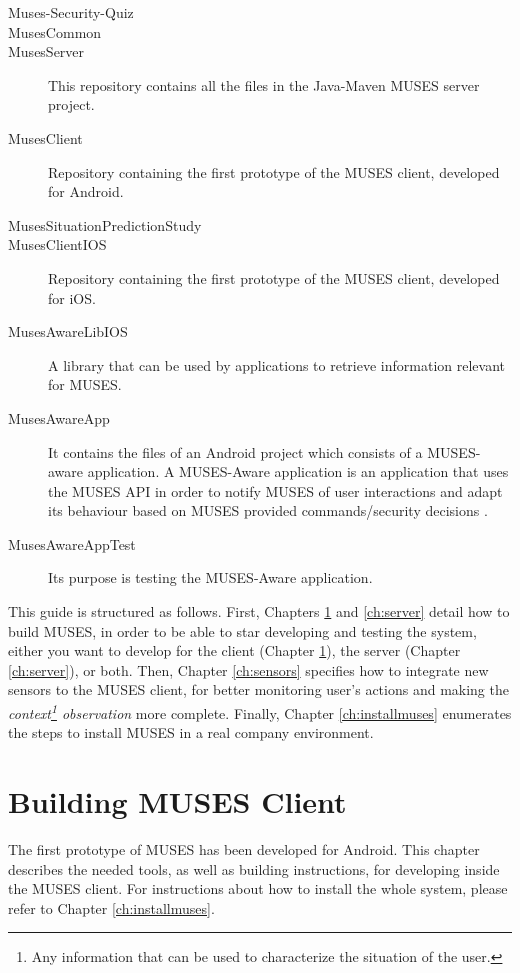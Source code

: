 \documentclass[a4paper,11pt]{book}
\begin{document}
\begin{description}
  \item[Muses-Security-Quiz]
  \item[MusesCommon] 
  \item[MusesServer] This repository contains all the files in the Java-Maven MUSES server project.
  \item[MusesClient] Repository containing the first prototype of the MUSES client, developed for Android.
  \item[MusesSituationPredictionStudy]
  \item[MusesClientIOS] Repository containing the first prototype of the MUSES client, developed for iOS.
  \item[MusesAwareLibIOS] A library that can be used by applications to retrieve information relevant for MUSES.
  \item[MusesAwareApp] It contains the files of an Android project which consists of a MUSES-aware application. A MUSES-Aware application is an application that uses the MUSES API in order to notify MUSES of user interactions and adapt its behaviour based on MUSES provided commands/security decisions \cite{deliverable24}.
  \item[MusesAwareAppTest] Its purpose is testing the MUSES-Aware application.
\end{description}

This guide is structured as follows. First, Chapters \ref{ch:client} and \ref{ch:server} detail how to build MUSES, in order to be able to star developing and testing the system, either you want to develop for the client (Chapter \ref{ch:client}), the server (Chapter \ref{ch:server}), or both. Then, Chapter \ref{ch:sensors} specifies how to integrate new sensors to the MUSES client, for better monitoring user's actions and making the \textit{context\footnote{Any information that can be used to characterize the situation of the user.\cite{deliverable61}} observation} more complete. Finally, Chapter \ref{ch:installmuses} enumerates the steps to install MUSES in a real company environment.

\chapter{Building MUSES Client}
\label{ch:client}

The first prototype of MUSES has been developed for Android. This chapter describes the needed tools, as well as building instructions, for developing inside the MUSES client. For instructions about how to install the whole system, please refer to Chapter \ref{ch:installmuses}.
\end{document}
